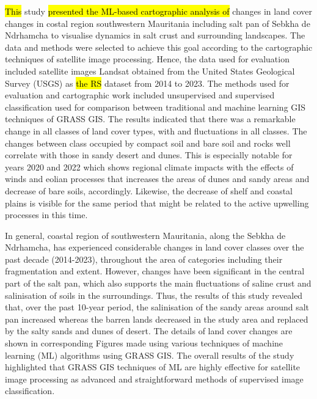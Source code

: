\documentclass[12pt,a4paper,oneside]{article}
\def \newpar{\vspace{6pt}}
\begin{document}
\newpar \hl{This} study \hl{presented the ML-based cartographic analysis of} changes in land cover changes in costal region southwestern Mauritania including salt pan of Sebkha de Ndrhamcha to visualise dynamics in salt crust and surrounding landscapes. The data and methods were selected to achieve this goal according to the cartographic techniques of satellite image processing. Hence, the data used for evaluation included satellite images Landsat obtained from the United States Geological Survey (USGS) as \hl{the RS} dataset from 2014 to 2023. The methods used for evaluation and cartographic work included unsupervised and supervised classification used for comparison between traditional and machine learning GIS techniques of GRASS GIS. The results indicated that there was a remarkable change in all classes of land cover types, with and fluctuations in all classes. The changes between class occupied by compact soil and bare soil and rocks well correlate with those in sandy desert and dunes. This is especially notable for years 2020 and 2022 which shows regional climate impacts with the effects of winds and eolian processes that increases the areas of dunes and sandy areas and decrease of bare soils, accordingly. Likewise, the decrease of shelf and coastal plains is visible for the same period that might be related to the active upwelling processes in this time.

\newpar In general, coastal region of southwestern Mauritania, along the Sebkha de Ndrhamcha, has experienced considerable changes in land cover classes over the past decade (2014-2023), throughout the area of categories including their fragmentation and extent. However, changes have been significant in the central part of the salt pan, which also supports the main fluctuations of saline crust and salinisation of soils in the surroundings. Thus, the results of this study revealed that, over the past 10-year period, the salinisation of the sandy areas around salt pan increased whereas the barren lands decreased in the study area and replaced by the salty sands and dunes of desert. The details of land cover changes are shown in corresponding Figures made using various techniques of machine learning (ML) algorithms using GRASS GIS. The overall results of the study highlighted that GRASS GIS techniques of ML are highly effective for satellite image processing as advanced and straightforward methods of supervised image classification. 
\end{document}
